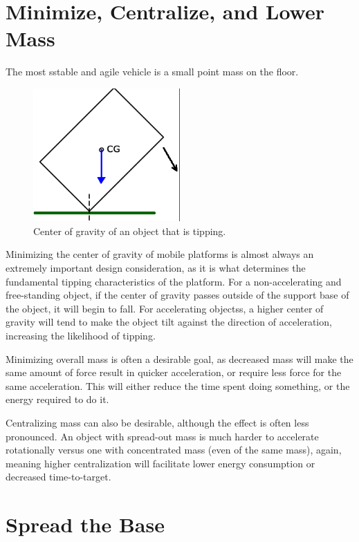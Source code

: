 \section{Minimize, Centralize, and Lower Mass}

\begin{theorem} \label{theorem:lower_mass}
	The most sstable and agile vehicle is a small point mass on the floor.
\end{theorem}

\begin{figure}
	\includegraphics[width=0.5\textwidth]{imgs/cg_explanation.png}
	\caption{Center of gravity of an object that is tipping.}
\end{figure}

Minimizing the center of gravity of mobile platforms is almost always an extremely important design consideration, as it is what determines the fundamental tipping characteristics of the platform. For a non-accelerating and free-standing object, if the center of gravity passes outside of the support base of the object, it will begin to fall. For accelerating objectss, a higher center of gravity will tend to make the object tilt against the direction of acceleration, increasing the likelihood of tipping.

Minimizing overall mass is often a desirable goal, as decreased mass will make the same amount of force result in quicker acceleration, or require less force for the same acceleration. This will either reduce the time spent doing something, or the energy required to do it.

Centralizing mass can also be desirable, although the effect is often less pronounced. An object with spread-out mass is much harder to accelerate rotationally versus one with concentrated mass (even of the same mass), again, meaning higher centralization will facilitate lower energy consumption or decreased time-to-target.

\section{Spread the Base}

